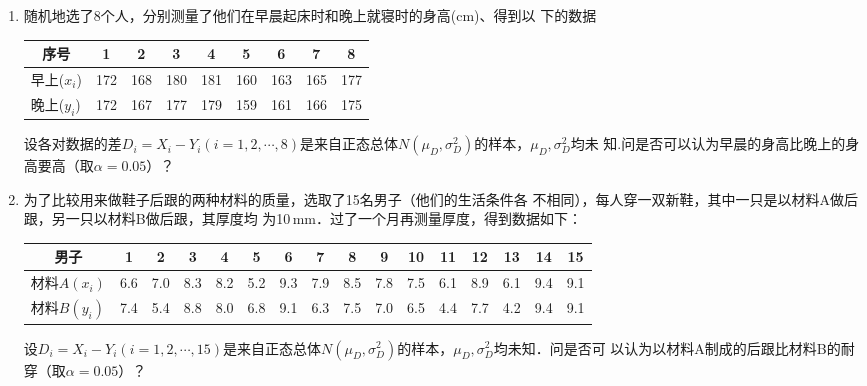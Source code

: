 \documentclass[10pt,a4paper]{article}
\begin{document}
\begin{enumerate}
    \item 随机地选了8个人，分别测量了他们在早晨起床时和晚上就寝时的身高(cm)、得到以
    下的数据
    \renewcommand{\arraystretch}{1.3}
    \begin{table}[H]\centering
        \begin{tabular}{c|cccccccc}
        \hline
        序号                             & 1                       & 2                       & 3                       & 4   & 5   & 6   & 7   & 8   \\ \hline
        早上($x_i$)                      & 172                     & 168                     & 180                     & 181 & 160 & 163 & 165 & 177 \\ \hline
        \multicolumn{1}{l|}{晚上($y_i$)} & \multicolumn{1}{l}{172} & \multicolumn{1}{l}{167} & \multicolumn{1}{l}{177} & 179 & 159 & 161 & 166 & 175 \\ \hline
        \end{tabular}
    \end{table}
    \renewcommand{\arraystretch}{1.0}
    设各对数据的差$D_i=X_i-Y_i(i=1,2,\cdots,8)$是来自正态总体$N(\mu_D,\sigma^2_D)$的样本，$\mu_D,\sigma^2_D$均未
    知.问是否可以认为早晨的身高比晚上的身高要高（取$\alpha=0.05$）？




    \item 为了比较用来做鞋子后跟的两种材料的质量，选取了15名男子（他们的生活条件各
    不相同），每人穿一双新鞋，其中一只是以材料A做后跟，另一只以材料B做后跟，其厚度均
    为10$\, $mm．过了一个月再测量厚度，得到数据如下：
    \renewcommand{\arraystretch}{1.3}
    \begin{table}[H]\centering
        \begin{tabular}{c|ccccccccccccccc}
        \hline
        男子                              & 1                       & 2                       & 3                       & 4   & 5   & 6   & 7   & 8   & 9   & 10  & 11  & 12  & 13  & 14  & 15  \\ \hline
        材料$A(x_i)$                      & 6.6                     & 7.0                     & 8.3                     & 8.2 & 5.2 & 9.3 & 7.9 & 8.5 & 7.8 & 7.5 & 6.1 & 8.9 & 6.1 & 9.4 & 9.1 \\ \hline
        \multicolumn{1}{l|}{材料$B(y_i)$} & \multicolumn{1}{l}{7.4} & \multicolumn{1}{l}{5.4} & \multicolumn{1}{l}{8.8} & 8.0 & 6.8 & 9.1 & 6.3 & 7.5 & 7.0 & 6.5 & 4.4 & 7.7 & 4.2 & 9.4 & 9.1 \\ \hline
        \end{tabular}
    \end{table}
    \renewcommand{\arraystretch}{1.0}
    设$D_i=X_i-Y_i(i=1,2,\cdots,15)$是来自正态总体$N(\mu_D,\sigma^2_D)$的样本，$\mu_D,\sigma^2_D$均未知．问是否可
    以认为以材料A制成的后跟比材料B的耐穿（取$\alpha=0.05$）？





\end{enumerate}
\end{document}
